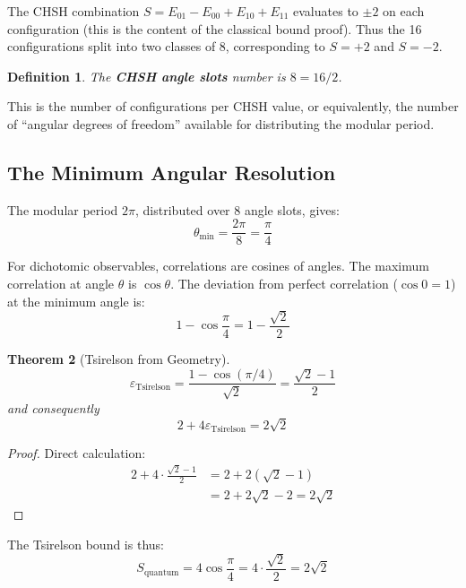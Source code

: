 \documentclass[12pt,a4paper]{article}
\newtheorem{theorem}{Theorem}[section]
\newtheorem{definition}[theorem]{Definition}
\newcommand{\eps}{\varepsilon}
\begin{document}
The CHSH combination $S = E_{01} - E_{00} + E_{10} + E_{11}$ evaluates to $\pm 2$ on each configuration (this is the content of the classical bound proof). Thus the 16 configurations split into two classes of 8, corresponding to $S = +2$ and $S = -2$.

\begin{definition}
The \textbf{CHSH angle slots} number is $8 = 16/2$.
\end{definition}

This is the number of configurations per CHSH value, or equivalently, the number of ``angular degrees of freedom'' available for distributing the modular period.

\subsection{The Minimum Angular Resolution}

The modular period $2\pi$, distributed over 8 angle slots, gives:
\begin{equation}
\theta_{\min} = \frac{2\pi}{8} = \frac{\pi}{4}
\end{equation}

For dichotomic observables, correlations are cosines of angles. The maximum correlation at angle $\theta$ is $\cos\theta$. The deviation from perfect correlation ($\cos 0 = 1$) at the minimum angle is:
\begin{equation}
1 - \cos\frac{\pi}{4} = 1 - \frac{\sqrt{2}}{2}
\end{equation}

\begin{theorem}[Tsirelson from Geometry]
\begin{equation}
\eps_{\text{Tsirelson}} = \frac{1 - \cos(\pi/4)}{\sqrt{2}} = \frac{\sqrt{2} - 1}{2}
\end{equation}
and consequently
\begin{equation}
2 + 4\eps_{\text{Tsirelson}} = 2\sqrt{2}
\end{equation}
\end{theorem}

\begin{proof}
Direct calculation:
\begin{align}
2 + 4 \cdot \frac{\sqrt{2}-1}{2} &= 2 + 2(\sqrt{2} - 1) \\
&= 2 + 2\sqrt{2} - 2 = 2\sqrt{2}
\end{align}
\end{proof}

The Tsirelson bound is thus:
\begin{equation}
S_{\text{quantum}} = 4 \cos\frac{\pi}{4} = 4 \cdot \frac{\sqrt{2}}{2} = 2\sqrt{2}
\end{equation}
\end{document}
